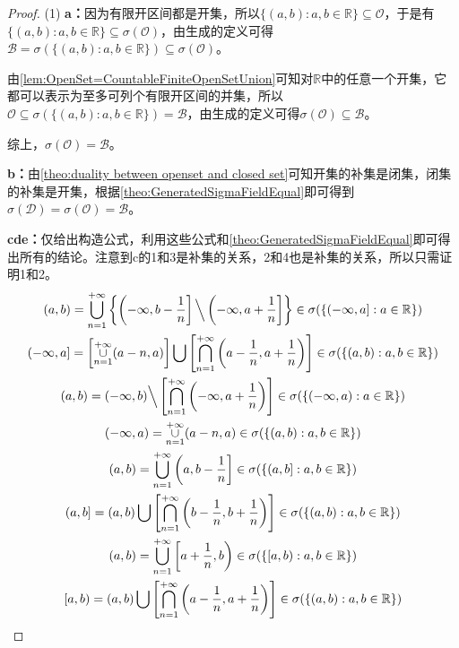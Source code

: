 \begin{proof}
	(1) \textbf{a：}因为有限开区间都是开集，所以$\{(a,b):a,b\in\mathbb{R}\}\subseteq\mathcal{O}$，于是有$\{(a,b):a,b\in\mathbb{R}\}\subseteq\sigma(\mathcal{O})$，由生成的定义可得$\mathcal{B}=\sigma(\{(a,b):a,b\in\mathbb{R}\})\subseteq\sigma(\mathcal{O})$。\par
	由\cref{lem:OpenSet=CountableFiniteOpenSetUnion}可知对$\mathbb{R}$中的任意一个开集，它都可以表示为至多可列个有限开区间的并集，所以$\mathcal{O}\subseteq\sigma(\{(a,b):a,b\in\mathbb{R}\})=\mathcal{B}$，由生成的定义可得$\sigma(\mathcal{O})\subseteq\mathcal{B}$。\par
	综上，$\sigma(\mathcal{O})=\mathcal{B}$。\par
	\textbf{b：}由\cref{theo:duality between openset and closed set}可知开集的补集是闭集，闭集的补集是开集，根据\cref{theo:GeneratedSigmaFieldEqual}即可得到$\sigma(\mathcal{D})=\sigma(\mathcal{O})=\mathcal{B}$。\par
	\textbf{cde：}仅给出构造公式，利用这些公式和\cref{theo:GeneratedSigmaFieldEqual}即可得出所有的结论。注意到c的1和3是补集的关系，2和4也是补集的关系，所以只需证明1和2。
	\begin{gather*}
		(a,b)=\underset{n=1}{\overset{+\infty}{\bigcup}}\left\{\left(-\infty,b-\frac{1}{n}\right]\Big\backslash\left(-\infty,a+\frac{1}{n}\right]\right\}\in\sigma(\{(-\infty,a]:a\in\mathbb{R}\}) \\
		(-\infty,a]=\left[\underset{n=1}{\overset{+\infty}{\cup}}(a-n,a)\right]\bigcup\left[\underset{n=1}{\overset{+\infty}{\bigcap}}\left(a-\frac{1}{n},a+\frac{1}{n}\right)\right]\in\sigma(\{(a,b):a,b\in\mathbb{R}\}) \\
		(a,b)=(-\infty,b)\Big\backslash\left[\underset{n=1}{\overset{+\infty}{\bigcap}}\left(-\infty,a+\frac{1}{n}\right)\right]\in\sigma(\{(-\infty,a):a\in\mathbb{R}\}) \\
		(-\infty,a)=\underset{n=1}{\overset{+\infty}{\cup}}(a-n,a)\in\sigma(\{(a,b):a,b\in\mathbb{R}\}) \\
		(a,b)=\underset{n=1}{\overset{+\infty}{\bigcup}}\left(a,b-\frac{1}{n}\right]\in\sigma(\{(a,b]:a,b\in\mathbb{R}\}) \\
		(a,b]=(a,b)\bigcup\left[\underset{n=1}{\overset{+\infty}{\bigcap}}\left(b-\frac{1}{n},b+\frac{1}{n}\right)\right]\in\sigma(\{(a,b):a,b\in\mathbb{R}\}) \\
		(a,b)=\underset{n=1}{\overset{+\infty}{\bigcup}}\left[a+\frac{1}{n},b\right)\in\sigma(\{[a,b):a,b\in\mathbb{R}\}) \\
		[a,b)=(a,b)\bigcup\left[\underset{n=1}{\overset{+\infty}{\bigcap}}\left(a-\frac{1}{n},a+\frac{1}{n}\right)\right]\in\sigma(\{(a,b):a,b\in\mathbb{R}\}) \\

\end{gather*}
\end{proof}
